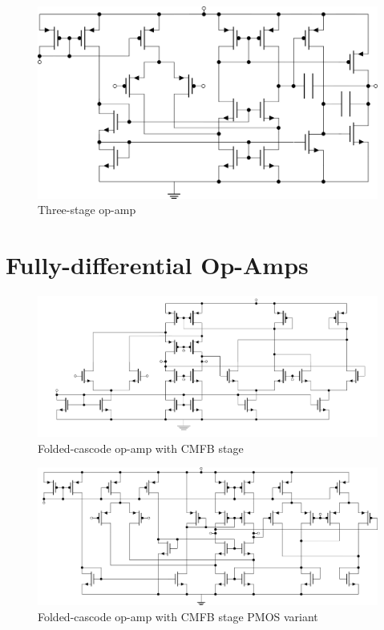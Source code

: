 \begin{figure}[H]
	\centering
	\includegraphics[width=0.8\linewidth]{Fig/ThreeStageOpAmp.PNG}
	\caption{Three-stage op-amp} \label{fig:threeStageOpAmp}
\end{figure}

\section{Fully-differential Op-Amps}

\begin{figure}[H]
	\centering
	\includegraphics[width=\linewidth]{Fig/FoldedCascodeWithCMFB.png}
	\caption{Folded-cascode op-amp with CMFB stage} \label{fig:foldedCascodeOpAmpCMFB}
\end{figure}

\begin{figure}[H]
	\centering
	\includegraphics[width=\linewidth]{Fig/FoldedCascodeOpAmpWithCMFB.png}
	\caption{Folded-cascode op-amp with CMFB stage PMOS variant} \label{fig:foldedCascodeOpAmpCMFBPMOS}
\end{figure}


